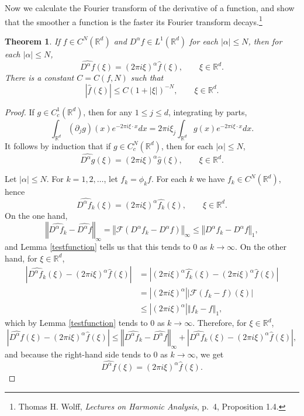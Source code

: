 \documentclass{article}
\newcommand{\norm}[1]{\left\Vert #1 \right\Vert}
\newtheorem{theorem}{Theorem}
\theoremstyle{definition}
\begin{document}
Now we calculate the Fourier transform of the derivative of a function, and show that
the smoother a function is the faster its Fourier transform decays.\footnote{Thomas H. Wolff, {\em Lectures on Harmonic Analysis}, p.~4, Proposition 1.4.}

\begin{theorem}
If $f \in C^N(\mathbb{R}^d)$ and $D^\alpha f \in L^1(\mathbb{R}^d)$ for each
$|\alpha| \leq N$, then for each $|\alpha| \leq N$,
\begin{equation}
\widehat{D^\alpha f}(\xi) = (2\pi i\xi)^\alpha \hat{f}(\xi), \qquad \xi \in \mathbb{R}^d.
\label{fourierD}
\end{equation}
There is a constant $C=C(f,N)$ such that
\[
|\hat{f}(\xi)| \leq C(1+|\xi|)^{-N}, \qquad \xi \in \mathbb{R}^d.
\]
\end{theorem}
\begin{proof}
If $g \in C^1_c(\mathbb{R}^d)$, then for any $1 \leq j \leq d$, integrating by parts,
\[
\int_{\mathbb{R}^d} (\partial_j g)(x) e^{-2\pi i\xi \cdot x} dx = 2\pi i \xi_j \int_{\mathbb{R}^d} g(x) e^{-2\pi i\xi\cdot x} dx.
\]
It follows by induction that if $g \in C^N_c(\mathbb{R}^d)$, then for each $|\alpha| \leq N$,
\[
\widehat{D^\alpha g}(\xi) = (2\pi i\xi)^{\alpha} \hat{g}(\xi), \qquad \xi \in \mathbb{R}^d.
\]

Let $|\alpha| \leq N$. 
For $k=1,2,\ldots$, let $f_k = \phi_k f$. For each $k$ we have
 $f_k \in C^N(\mathbb{R}^d)$, hence
\[
\widehat{D^\alpha f_k}(\xi) = (2\pi i\xi)^\alpha \widehat{f_k}(\xi), \qquad \xi \in \mathbb{R}^d.
\]
On the one hand,
\[
\norm{\widehat{D^\alpha f_k}-\widehat{D^\alpha f}}_\infty 
=\norm{\mathscr{F}(D^\alpha f_k - D^\alpha f)}_\infty
\leq \norm{D^\alpha f_k-D^\alpha f}_1,
\]
and Lemma \ref{testfunction} tells us that this tends to $0$ as $k \to \infty$. 
On the other hand, 
for $\xi \in \mathbb{R}^d$,  
\begin{align*}
|\widehat{D^\alpha f_k}(\xi)  - (2\pi i\xi)^\alpha \hat{f}(\xi)|&=
|(2\pi i\xi)^\alpha \widehat{f_k}(\xi)-(2\pi i\xi)^\alpha \hat{f}(\xi)|\\
&=|(2\pi i \xi)^\alpha|  |\mathscr{F}(f_k-f)(\xi)|\\
&\leq |(2\pi i \xi)^\alpha| \norm{f_k-f}_1,
\end{align*}
which by Lemma \ref{testfunction} tends to $0$ as $k \to \infty$.
Therefore, for $\xi \in \mathbb{R}^d$,
\[
|\widehat{D^\alpha f}(\xi)-(2\pi i\xi)^\alpha \hat{f}(\xi)| \leq \norm{\widehat{D^\alpha f_k}-\widehat{D^\alpha f}}_\infty 
+|\widehat{D^\alpha f_k}(\xi)  - (2\pi i\xi)^\alpha \hat{f}(\xi)|,
\]
and because the right-hand side tends to $0$ as $k \to \infty$, we get
\[
\widehat{D^\alpha f}(\xi) = (2\pi i\xi)^\alpha \hat{f}(\xi).
\]


\end{proof}
\end{document}
